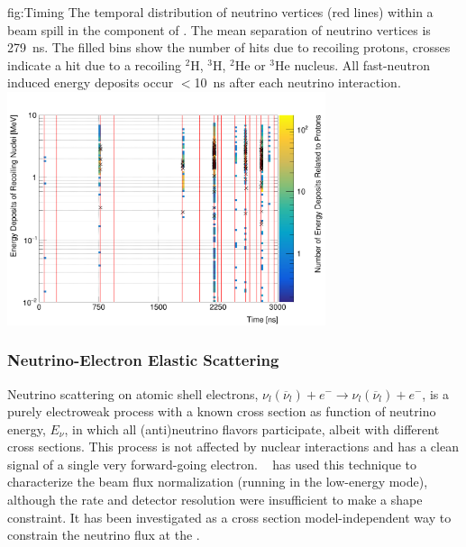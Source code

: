 \begin{dunefigure} %
{fig:Timing}
{The temporal distribution of neutrino vertices (red lines) within a beam spill in the  component of  .
		The mean separation of neutrino vertices is \SI{279}{\nano\second}. The filled bins show the number of hits due to recoiling protons, crosses indicate a hit due to a recoiling $^{2}$H, $^3$H, $^2$He or $^3$He nucleus.
		All fast-neutron induced energy deposits occur $<$\SI{10}{\nano\second} after each neutrino interaction.}
\includegraphics[width=0.7\textwidth]{graphics/recoil_proton_edep_vs_vtx_time_a.png}
\end{dunefigure}
	
\subsubsection{Neutrino-Electron Elastic Scattering}
\label{sec:appx-nd:lartpc-nu-electron-scatt}

Neutrino scattering on atomic shell electrons, $\nu_{l}(\overline{\nu}_{l}) + e^{-} \rightarrow \nu_{l}(\overline{\nu}_{l}) + e^{-}$,
is a purely electroweak process with a known cross section as function of neutrino energy, $E_{\nu}$, in which all (anti)neutrino flavors participate, albeit with different cross sections. This process is not affected by nuclear interactions and has a clean signal of a single very forward-going electron. ~\cite{Park:2015eqa} has used this technique to characterize the  beam flux normalization (running in the  low-energy mode), although the rate and detector resolution were insufficient to make a shape constraint. It has been investigated as a cross section model-independent way to constrain the neutrino flux at the   .

